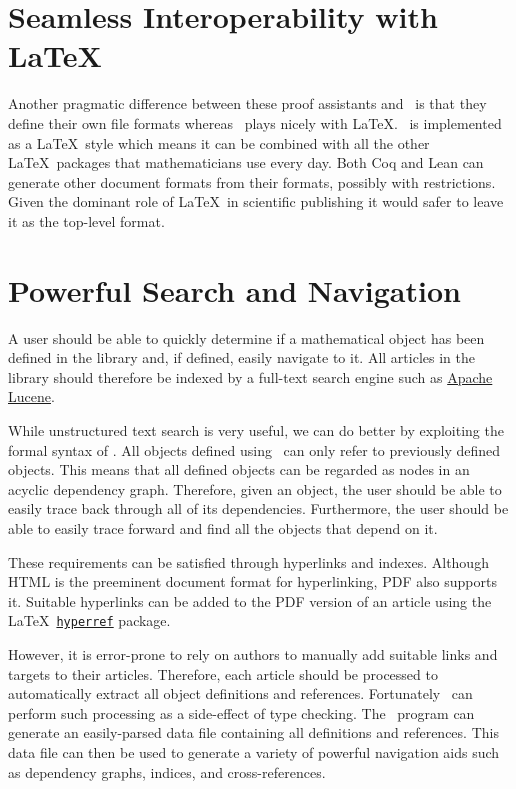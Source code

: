 \documentclass{amsart}
\begin{document}
\section{Seamless Interoperability with \LaTeX}

Another pragmatic difference between these proof assistants and \ZN\ is that they define their own file formats whereas
\ZN\ plays nicely with \LaTeX. 
\ZN\ is implemented as a \LaTeX\ style which means it can be combined with all the other \LaTeX\
packages that mathematicians use every day.
Both Coq and Lean can generate other document formats from their formats, possibly with restrictions.
Given the dominant role of \LaTeX\ in scientific publishing it would safer to leave it as the top-level format.

 \hypertarget{powerful-search-and-navigation}{}
 \section{Powerful Search and Navigation}
 
 A user should be able to quickly determine if a mathematical object has been defined in the library and, if defined,
 easily navigate to it.
 All articles in the library should therefore be indexed by a full-text search engine such as \href{https://lucene.apache.org}{Apache Lucene}.
 
 While unstructured text search is very useful, we can do better by exploiting the formal syntax of \ZN.
 All objects defined using \ZN\ can only refer to previously defined objects.
 This means that all defined objects can be regarded as nodes in an acyclic dependency graph.
 Therefore, given an object, the user should be able to easily trace back through all of its dependencies.
 Furthermore, the user should be able to easily trace forward and find all the objects that depend on it.
 
 These requirements can be satisfied through hyperlinks and indexes.
 Although HTML is the preeminent document format for hyperlinking, PDF also supports it.
 Suitable hyperlinks can be added to the PDF version of an article using the \LaTeX\
 \href{https://ctan.org/pkg/hyperref}{\texttt{hyperref}} package.
 
 However, it is error-prone to rely on authors to manually add suitable links and targets to their articles.
 Therefore, each article should be processed to automatically extract all object definitions and references.
 Fortunately \fuzz\ can perform such processing as a side-effect of type checking.
 The \fuzz\ program can generate an easily-parsed data file containing all definitions and references.
 This data file can then be used to generate a variety of powerful navigation aids such as
 dependency graphs, indices, and cross-references.
 
\end{document}

